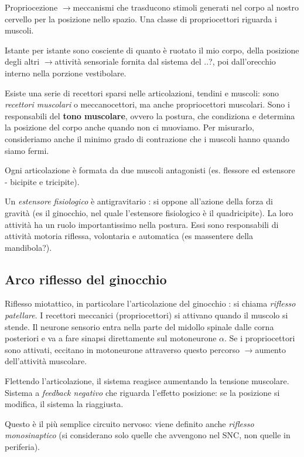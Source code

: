 \documentclass[a4paper,12pt]{article}
\newcommand{\lfreccia}{\ensuremath{\longrightarrow}}
\begin{document}
Propriocezione \lfreccia meccanismi che trasducono stimoli generati nel corpo al nostro cervello per la posizione nello spazio.
Una classe di propriocettori riguarda i muscoli.

Istante per istante sono cosciente di quanto è ruotato il mio corpo, della posizione degli altri \lfreccia attività sensoriale fornita dal sistema del ..?, poi dall'orecchio interno nella porzione vestibolare. 

Esiste una serie di recettori sparsi nelle articolazioni, tendini e muscoli: sono \emph{recettori muscolari} o meccanocettori, ma anche propriocettori muscolari. Sono i responsabili del \textbf{tono muscolare}, ovvero la postura, che condiziona e determina la posizione del corpo anche quando non ci muoviamo. Per misurarlo, consideriamo anche il minimo grado di contrazione che i muscoli hanno quando siamo fermi.

Ogni articolazione è formata da due muscoli antagonisti (es. flessore ed estensore - bicipite e tricipite).

Un \emph{estensore fisiologico} è antigravitario : si oppone all'azione della forza di gravità (es il ginocchio, nel quale l'estensore fisiologico è il quadricipite). La loro attività ha un ruolo importantissimo nella postura. Essi sono responsabili di attività motoria riflessa, volontaria e automatica (es massentere della mandibola?).

\subsection{Arco riflesso del ginocchio}
Riflesso miotattico, in particolare l'articolazione del ginocchio : si chiama \emph{riflesso patellare}. 
I recettori meccanici (propriocettori) si attivano quando il muscolo si stende. Il neurone sensorio entra nella parte del midollo spinale dalle corna posteriori e va a fare sinapsi direttamente sul motoneurone $\alpha$. Se i propriocettori sono attivati, eccitano in motoneurone attraverso questo percorso \lfreccia aumento dell'attività muscolare.

Flettendo l'articolazione, il sistema reagisce aumentando la tensione muscolare. Sistema a \emph{feedback negativo} che riguarda l'effetto posizione: se la posizione si modifica, il sistema la riaggiusta.

Questo è il più semplice circuito nervoso: viene definito anche \emph{riflesso monosinaptico} (si considerano solo quelle che avvengono nel SNC, non quelle in periferia).
\end{document}
